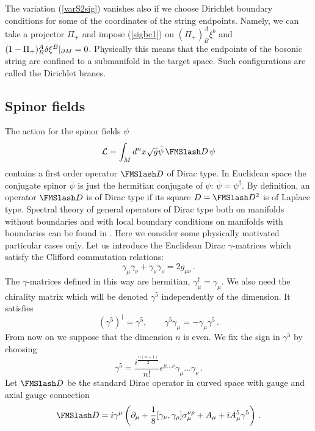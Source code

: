 The variation (\ref{varS2sig}) vanishes also if we choose Dirichlet
boundary conditions for some of the 
coordinates of the string endpoints. Namely, we can take a projector
$\Pi_+ $ and impose (\ref{sigbc1}) on $(\Pi_+)_B^A \xi^b$
and  $(1-\Pi_+)_B^A \delta\xi^B\vert_{\partial M} =0$. 
Physically this means that the endpoints of the bosonic string
are confined to a submanifold in the target space.
Such configurations \cite{Dai:1989ua}
are called the Dirichlet branes.
\subsection{Spinor fields}\label{s3spin}
The action for the spinor fields $\psi$ 
\begin{equation}
\mathcal{L}=\int_M d^n x \sqrt{g} \bar \psi\, \Dir\, \psi
\label{spinS}
\end{equation}
contains a first order operator $\Dir$ of Dirac type.
In Euclidean space the conjugate spinor $\bar \psi$
is just the hermitian conjugate of $\psi$: $\bar \psi=
\psi^\dag$.
By definition, an operator $\Dir$ is of Dirac type if
its square $D=\Dir^2$ is of Laplace type.
Spectral theory of general operators of Dirac type both
on manifolds without boundaries and with local boundary
conditions on manifolds with boundaries can be found
in \cite{Branson:1992a,Branson:1992b}. Here we consider
some physically motivated particular cases only. Let us introduce
the Euclidean Dirac $\gamma$-matrices which satisfy the Clifford
commutation relations:
\begin{equation}
\gamma_\mu\gamma_\nu + \gamma_\nu \gamma_\nu = 2g_{\mu\nu} \,.
\label{Clifford}
\end{equation}
The $\gamma$-matrices defined in this way are hermitian,
$\gamma_\mu^\dag =\gamma_\mu$. We also need the chirality 
matrix which will be denoted $\gamma^5$ independently of
the dimension. It satisfies
\begin{equation}
(\gamma^5)^\dag =\gamma^5 ,\qquad \gamma^5\gamma_\mu =
-\gamma_\mu \gamma^5 \,.\label{gamma5}
\end{equation}
From now on we suppose that the dimension $n$ is even. We fix the sign in
$\gamma^5$ by choosing
\begin{equation}
\gamma^5=\frac{i^{\frac{n(n-1)}2}}{n!}
\epsilon^{\mu\dots\nu}\gamma_\mu \dots \gamma_\nu \,.
\label{sign5}
\end{equation}
Let $\Dir$ be the standard Dirac operator in curved space
with gauge and axial gauge connection
\begin{equation}
\Dir =i\gamma^\mu \left(\partial_\mu +\frac 18 [\gamma_\nu ,\gamma_\rho ]
\sigma_\mu^{\nu\rho} +A_\mu +iA_\mu^5 \gamma^5 \right) \,.
\label{dirop}
\end{equation}
